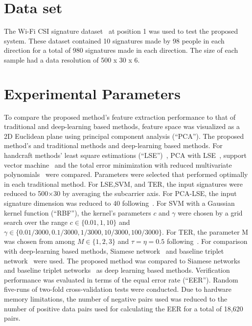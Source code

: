 \label{chp:Experiments}
\section{Data set}
\label{sec:Dataset}
The Wi-Fi CSI signature dataset~\cite{moon2017air} at position 1 was used to test the proposed system. These dataset contained 10 signatures made by 98 people in each direction for a total of 980 signatures made in each direction. The size of each sample had a data resolution of 500 x 30 x 6. 

\section{Experimental Parameters}
To compare the proposed method's feature extraction performance to that of traditional and deep-learning based methods, feature space was visualized as a 2D Euclidean plane using principal component analysis (``PCA''). 
The proposed method's and traditional methods and deep-learning based methods.
For handcraft methods' least square estimations (``LSE'')~\cite{duda2012pattern}, PCA with LSE~\cite{turk1991eigenfaces}, support vector machine~\cite{vapnik2013nature} and the total error minimization with reduced multivariate polynomials~\cite{toh2003fingerprint,toh2008between} were compared. Parameters were selected that performed optimally in each traditional method. For LSE,SVM, and TER, the input signatures were reduced to 500$\times$30 by averaging the subcarrier axis. For PCA-LSE, the input signature dimension was reduced to 40 following~\cite{moon2017air}. For SVM with a Gaussian kernel function (``RBF''), the kernel's parameters $c$ and $\gamma$ were chosen by a grid search over the range $c\in\{0.01,1,10\}$ and $\gamma\in\{0.01/3000, 0.1/3000, 1/3000, 10/3000, 100/3000\}$. For TER, the parameter M was chosen from among $M\in\{1,2,3\}$ and $\tau=\eta=0.5$ following~\cite{toh2008between}.
For comparison with deep-learning based methods, Siamese network~\cite{koch2015siamese} and baseline triplet network~\cite{hoffer2015deep} were used.
The proposed method was compared to Siamese networks~\cite{koch2015siamese} and baseline triplet networks~\cite{hoffer2015deep} as deep learning based methods.
Verification performance was evaluated in terms of the equal error rate (``EER''). Random five-runs of two-fold cross-validation tests were conducted.
Due to hardware memory limitations, the number of negative pairs used was reduced to the number of positive data pairs used for calculating the EER for a total of 18,620 pairs.
